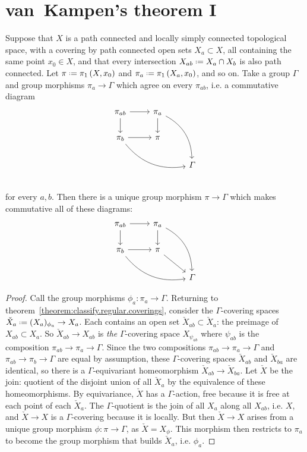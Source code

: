 \section{van~Kampen's theorem I}
\begin{theorem}\label{theorem:van.Kampen.I}
Suppose that \(X\) is a path connected and locally simply connected topological space, with a covering by path connected open sets \(X_a \subset X\), all containing the same point \(x_0 \in X\), and that every intersection \(X_{ab} \defeq X_a \cap X_b\) is also path connected. 
Let \(\pi\defeq\fundamentalGroup{X,x_0}\) and \(\pi_a\defeq\fundamentalGroup{X_a,x_0}\), and so on.
Take a group \(\Gamma\) and group morphisms \(\pi_a \to \Gamma\) which agree on every \(\pi_{ab}\), i.e. a commutative diagram
\[
\begin{tikzcd}
\pi_{ab} \arrow{r}{} \arrow{d}{} & \pi_a \arrow{d}{} \arrow[bend left]{rdd} \\
\pi_b \arrow{r}{} \arrow[bend right]{rrd}
& \pi \\
& & \Gamma \\
\end{tikzcd}
\]
for every \(a,b\).
Then there is a unique group morphism \(\pi \to \Gamma\) which makes commutative all of these diagrams:
\[
\begin{tikzcd}
\pi_{ab} \arrow{r}{} \arrow{d}{} & \pi_a \arrow{d}{} \arrow[bend left]{rdd} \\
\pi_b \arrow{r}{} \arrow[bend right]{rrd}
& \pi \arrow{rd}{} \\
& & \Gamma 
\end{tikzcd}
\]
\end{theorem}
\begin{proof}
Call the group morphisms \(\phi_a \colon \pi_a \to \Gamma\).
Returning to theorem~\vref{theorem:classify.regular.coverings}, consider the \(\Gamma\)-covering spaces \(\check{X}_a \defeq (X_a)_{\phi_a} \to X_a\).
Each contains an open set \(\check{X}_{ab} \subset \check{X}_a\): the preimage of \(X_{ab} \subset X_a\).
So \(\check{X}_{ab} \to X_{ab}\) is \emph{the} \(\Gamma\)-covering space \(X_{\psi_{ab}}\) where \(\psi_{ab}\) is the composition \(\pi_{ab} \to \pi_a \to \Gamma\).
Since the two compositions \(\pi_{ab} \to \pi_a \to \Gamma\) and \(\pi_{ab} \to \pi_b \to \Gamma\) are equal by assumption, these \(\Gamma\)-covering spaces \(\check{X}_{ab}\) and \(\check{X}_{ba}\) are identical, so there is a \(\Gamma\)-equivariant homeomorphism \(\check{X}_{ab}\to \check{X}_{ba}\).
Let \(\check{X}\) be the join: quotient of the disjoint union of all \(\check{X}_a\) by the equivalence of these homeomorphisms.
By equivariance, \(\check{X}\) has a \(\Gamma\)-action, free because it is free at each point of each \(\check{X}_a\).
The \(\Gamma\)-quotient is the join of all \(X_a\) along all \(X_{ab}\), i.e. \(X\), and \(\check{X} \to X\) is a \(\Gamma\)-covering because it is locally.
But then \(\check{X} \to X\) arises from a unique group morphism \(\phi \colon \pi \to \Gamma\), as \(\check{X}=X_{\phi}\).
This morphism then restricts to \(\pi_a\) to become the group morphism that builds \(\check{X}_a\), i.e. \(\phi_a\).
\end{proof}



